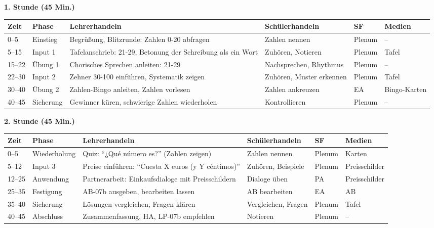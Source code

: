 \documentclass[11pt,a4paper]{article}
\begin{document}
\textbf{1. Stunde (45 Min.)}

\begin{longtable}{|p{1cm}|p{1.5cm}|p{4cm}|p{3cm}|p{2cm}|p{2cm}|}
\hline
\textbf{Zeit} & \textbf{Phase} & \textbf{Lehrerhandeln} & \textbf{Schülerhandeln} & \textbf{SF} & \textbf{Medien} \\
\hline
\endhead

0--5 & Einstieg & Begrüßung, Blitzrunde: Zahlen 0-20 abfragen & Zahlen nennen & Plenum & -- \\
\hline

5--15 & Input 1 & Tafelanschrieb: 21-29, Betonung der Schreibung als ein Wort & Zuhören, Notieren & Plenum & Tafel \\
\hline

15--22 & Übung 1 & Chorisches Sprechen anleiten: 21-29 & Nachsprechen, Rhythmus & Plenum & -- \\
\hline

22--30 & Input 2 & Zehner 30-100 einführen, Systematik zeigen & Zuhören, Muster erkennen & Plenum & Tafel \\
\hline

30--40 & Übung 2 & Zahlen-Bingo anleiten, Zahlen vorlesen & Zahlen ankreuzen & EA & Bingo-Karten \\
\hline

40--45 & Sicherung & Gewinner küren, schwierige Zahlen wiederholen & Kontrollieren & Plenum & -- \\
\hline
\end{longtable}

\vspace{1em}

\textbf{2. Stunde (45 Min.)}

\begin{longtable}{|p{1cm}|p{1.5cm}|p{4cm}|p{3cm}|p{2cm}|p{2cm}|}
\hline
\textbf{Zeit} & \textbf{Phase} & \textbf{Lehrerhandeln} & \textbf{Schülerhandeln} & \textbf{SF} & \textbf{Medien} \\
\hline
\endhead

0--5 & Wieder\-holung & Quiz: ``¿Qué número es?'' (Zahlen zeigen) & Zahlen nennen & Plenum & Karten \\
\hline

5--12 & Input 3 & Preise einführen: ``Cuesta X euros (y Y céntimos)'' & Zuhören, Beispiele & Plenum & Preisschilder \\
\hline

12--25 & Anwen\-dung & Partnerarbeit: Einkaufsdialoge mit Preisschildern & Dialoge üben & PA & Preisschilder \\
\hline

25--35 & Festigung & AB-07b ausgeben, bearbeiten lassen & AB bearbeiten & EA & AB \\
\hline

35--40 & Sicherung & Lösungen vergleichen, Fragen klären & Vergleichen, Fragen & Plenum & Tafel \\
\hline

40--45 & Abschluss & Zusammenfassung, HA, LP-07b empfehlen & Notieren & Plenum & -- \\
\hline
\end{longtable}
\end{document}
